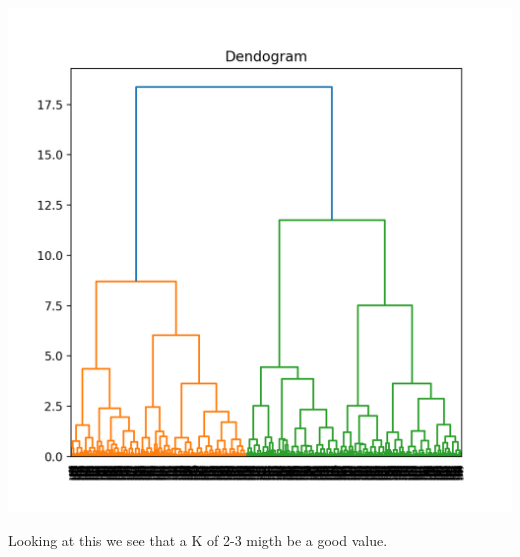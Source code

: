 \documentclass[10pt]{article}
\begin{document}
    \begin{center}
        \includegraphics[scale=0.5]{dend.png}
    \end{center}

    Looking at this we see that a K of 2-3 migth be a good value. 
\end{document}
